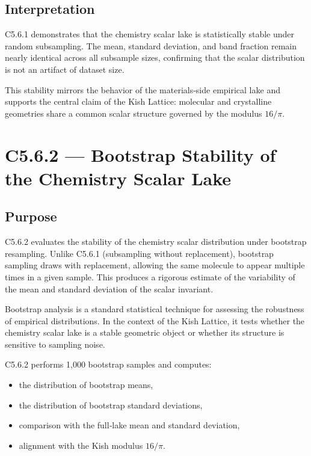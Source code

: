 \documentclass[11pt, letterpaper, openany]{book}
\begin{document}
\subsection*{Interpretation}
C5.6.1 demonstrates that the chemistry scalar lake is statistically stable under
random subsampling. The mean, standard deviation, and band fraction remain nearly
identical across all subsample sizes, confirming that the scalar distribution is
not an artifact of dataset size.

This stability mirrors the behavior of the materials‑side empirical lake and
supports the central claim of the Kish Lattice: molecular and crystalline
geometries share a common scalar structure governed by the modulus \(16/\pi\).


\section{C5.6.2 — Bootstrap Stability of the Chemistry Scalar Lake}

\subsection*{Purpose}
C5.6.2 evaluates the stability of the chemistry scalar distribution under
bootstrap resampling. Unlike C5.6.1 (subsampling without replacement), bootstrap
sampling draws with replacement, allowing the same molecule to appear multiple
times in a given sample. This produces a rigorous estimate of the variability of
the mean and standard deviation of the scalar invariant.

Bootstrap analysis is a standard statistical technique for assessing the
robustness of empirical distributions. In the context of the Kish Lattice, it
tests whether the chemistry scalar lake is a stable geometric object or whether
its structure is sensitive to sampling noise.

C5.6.2 performs 1,000 bootstrap samples and computes:

\begin{itemize}
    \item the distribution of bootstrap means,
    \item the distribution of bootstrap standard deviations,
    \item comparison with the full‑lake mean and standard deviation,
    \item alignment with the Kish modulus \(16/\pi\).
\end{itemize}
\end{document}
